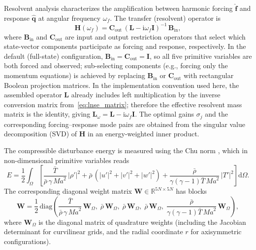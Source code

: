 \documentclass[11pt]{article}
\newcommand{\dd}{\mathrm{d}}
\newcommand{\Ma}{\mathit{Ma}}
\newcommand{\bq}{\mathbf{q}}
\newcommand{\bB}{\mathbf{B}}
\newcommand{\bC}{\mathbf{C}}
\newcommand{\bH}{\mathbf{H}}
\newcommand{\bI}{\mathbf{I}}
\newcommand{\bL}{\mathbf{L}}
\newcommand{\bW}{\mathbf{W}}
\begin{document}
Resolvent analysis characterizes the amplification between harmonic forcing $\hat{\mathbf{f}}$ and response $\hat{\bq}$ at angular frequency $\omega_f$.
The transfer (resolvent) operator is
\begin{equation}
  \bH(\omega_f) = \bC_{\mathrm{out}}\,(\bL - \mathrm{i}\omega_f\bI)^{-1}\,\bB_{\mathrm{in}},
  \label{eq:resolvent_op}
\end{equation}
where $\bB_{\mathrm{in}}$ and $\bC_{\mathrm{out}}$ are input and output restriction operators that select which state-vector components participate as forcing and response, respectively.
In the default (full-state) configuration, $\bB_{\mathrm{in}} = \bC_{\mathrm{out}} = \bI$, so all five primitive variables are both forced and observed; sub-selecting components (e.g., forcing only the momentum equations) is achieved by replacing $\bB_{\mathrm{in}}$ or $\bC_{\mathrm{out}}$ with rectangular Boolean projection matrices.
In the implementation convention used here, the assembled operator $\bL$ already includes left multiplication by the inverse conversion matrix from~\eqref{eq:lnse_matrix}; therefore the effective resolvent mass matrix is the identity, giving $\bL_\omega = \bL - \mathrm{i}\omega_f\bI$.
The optimal gains $\sigma_j$ and the corresponding forcing--response mode pairs are obtained from the singular value decomposition (SVD) of $\bH$ in an energy-weighted inner product.

The compressible disturbance energy is measured using the Chu norm \cite{chu1965energy}, which in non-dimensional primitive variables reads
\begin{equation}
  E = \frac{1}{2}\int_\Omega
  \left[
    \frac{\bar{T}}{\bar{\rho}\,\gamma\,\Ma^2}\,|\rho'|^2
  + \bar{\rho}\,(|u'|^2 + |v'|^2 + |w'|^2)
  + \frac{\bar{\rho}}{\gamma(\gamma-1)\bar{T}\,\Ma^2}\,|T'|^2
  \right]\dd\Omega.
  \label{eq:chu_norm}
\end{equation}
The corresponding diagonal weight matrix $\bW \in \mathbb{R}^{5N\times 5N}$ has blocks
\begin{equation}
  \bW = \frac{1}{2}\,\mathrm{diag}\!\left(
    \frac{\bar{T}}{\bar{\rho}\,\gamma\,\Ma^2}\,\bW_\Omega,\;
    \bar{\rho}\,\bW_\Omega,\;
    \bar{\rho}\,\bW_\Omega,\;
    \bar{\rho}\,\bW_\Omega,\;
    \frac{\bar{\rho}}{\gamma(\gamma-1)\bar{T}\,\Ma^2}\,\bW_\Omega
  \right),
  \label{eq:W_diag}
\end{equation}
where $\bW_\Omega$ is the diagonal matrix of quadrature weights (including the Jacobian determinant for curvilinear grids, and the radial coordinate $r$ for axisymmetric configurations).
\end{document}
